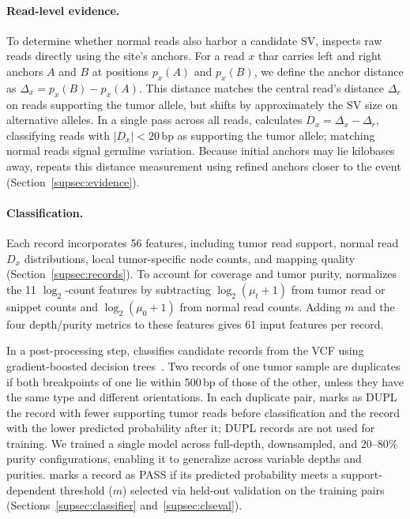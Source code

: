 \paragraph{Read-level evidence.}
To determine whether normal reads also harbor a candidate SV, \tool inspects raw reads directly using the site's anchors.
For a read $x$ thar carries left and right anchors $A$ and $B$ at positions $p_x(A)$ and $p_x(B)$, we define the anchor distance as $\Delta_x = p_x(B) - p_x(A)$.
This distance matches the central read's distance $\Delta_r$ on reads supporting the tumor allele, but shifts by approximately the SV size on alternative alleles.
In a single pass across all reads, \tool calculates
$D_x = \Delta_x - \Delta_r$,
classifying reads with $|D_x| < 20$\,bp as supporting the tumor allele; matching normal reads signal germline variation.
Because initial anchors may lie kilobases away, \tool repeats this distance measurement using refined anchors closer to the event (Section~\ref{supsec:evidence}).

\vspace*{-0.3cm}
\paragraph{Classification.}
Each record incorporates 56 features, including tumor read support, normal read $D_x$ distributions, local tumor-specific node counts, and mapping quality (Section~\ref{supsec:records}).
To account for coverage and tumor purity, \tool normalizes the 11 $\log_2$-count features by subtracting $\log_2(\mu_t+1)$ from tumor read or snippet counts and $\log_2(\mu_0+1)$ from normal read counts.
Adding $m$ and the four depth/purity metrics to these features gives 61 input features per record.

In a post-processing step, \tool classifies candidate records from the VCF using gradient-boosted decision trees~\cite{friedman,sklearn}.
Two records of one tumor sample are duplicates if both breakpoints of one lie within 500\,bp of those of the other, unless they have the same type and different orientations.
In each duplicate pair, \tool marks as DUPL the record with fewer supporting tumor reads before classification and the record with the lower predicted probability after it; DUPL records are not used for training.
We trained a single model across full-depth, downsampled, and 20--80\% purity configurations, enabling it to generalize across variable depths and purities.
\tool marks a record as PASS if its predicted probability meets a support-dependent threshold ($m$) selected via held-out validation on the training pairs (Sections~\ref{supsec:classifier} and~\ref{supsec:clseval}).

